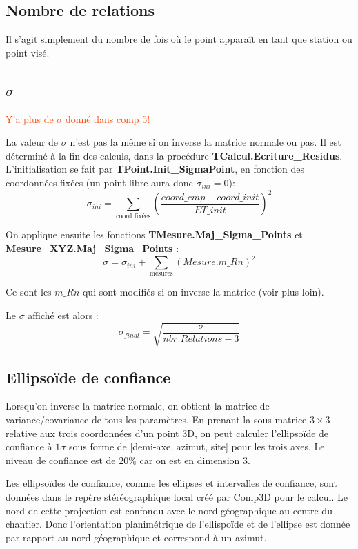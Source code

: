 \documentclass[french]{report}
\newcommand{\revoir}[1]{\textcolor{OrangeRed}{#1}}
\begin{document}
\subsection{Nombre de relations}

Il s'agit simplement du nombre de fois où le point apparaît en tant que station ou point visé.

\subsection{$\sigma$}
\revoir{Y'a plus de $\sigma$ donné dans comp 5!}

La valeur de $\sigma$ n'est pas la même si on inverse la matrice normale ou pas.
Il est déterminé à la fin des calculs, dans la procédure \textbf{TCalcul.Ecriture\_Residus}.
L'initialisation se fait par \textbf{TPoint.Init\_SigmaPoint}, en fonction des coordonnées fixées (un point libre aura donc $\sigma_{ini}=0$):
$$\sigma_{ini} = \sum_{\text{coord fixées}} \left( \frac{coord\_cmp-coord\_init}{ET\_init} \right)^2$$

On applique ensuite les fonctions \textbf{TMesure.Maj\_Sigma\_Points} et \textbf{Mesure\_XYZ.Maj\_Sigma\_Points} :
$$\sigma=\sigma_{ini} + \sum_{\text{mesures}} (Mesure.m\_Rn)^2$$

Ce sont les $m\_Rn$ qui sont modifiés si on inverse la matrice (voir plus loin).

Le $\sigma$ affiché est alors : $$\sigma_{final} = \sqrt{\frac{\sigma}{nbr\_Relations-3}}$$


\subsection{Ellipsoïde de confiance}\label{ellipsoides-de-confiance}

Lorsqu'on inverse la matrice normale, on obtient la matrice de variance/covariance de tous les paramètres.
En prenant la sous-matrice $3 \times 3$ relative aux trois coordonnées d'un point 3D, on peut calculer l'ellipsoïde de confiance à $1 \sigma$
sous forme de [demi-axe, azimut, site] pour les trois axes. Le niveau de confiance est de $20\%$ car on est en dimension 3.

Les ellipsoïdes de confiance, comme les ellipses et intervalles de confiance, sont données dans le repère stéréographique local
créé par Comp3D pour le calcul. Le nord de cette projection est confondu avec le nord géographique au centre du chantier.
Donc l'orientation planimétrique de l'ellispoïde et de l'ellipse est donnée par rapport au nord géographique et correspond à un azimut.
\end{document}
